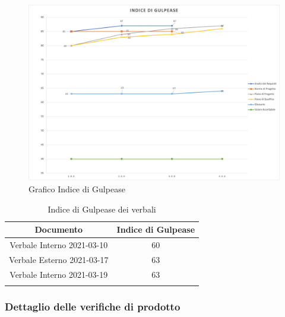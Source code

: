 \begin{center}
    \begin{figure}[!htb]
        \centering
        \includegraphics[scale=0.60]{res/images/ra/ra_gulpease.png}
        \caption{Grafico Indice di Gulpease}
    \end{figure}

    \newpage

    \begin{center}
        \begin{longtable}{|c|c|}
            \hline
            \rowcolor{lighter-grayer}
            \textbf{Documento}         & \textbf{Indice di Gulpease} \\
            \hline
            \endfirsthead

            \hline
            Verbale Interno 2021-03-10 & 60                          \\
            Verbale Esterno 2021-03-17 & 63                          \\      
            Verbale Interno 2021-03-19 & 63                          \\        
            \hline
            \rowcolor{white}
            \caption{Indice di Gulpease dei verbali}
        \end{longtable}
    \end{center}
\end{center}

\subsubsection{Dettaglio delle verifiche di prodotto}

